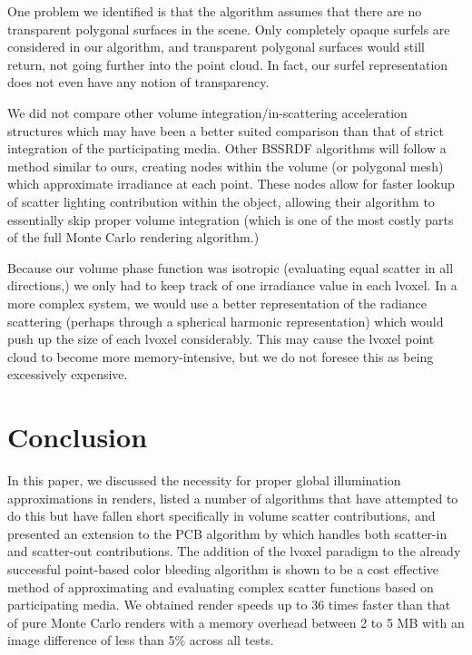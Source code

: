 \documentclass[12pt]{ucthesis}
\begin{document}
One problem we identified is that the algorithm assumes that there are no transparent polygonal surfaces in the scene.  Only completely opaque surfels are considered in our algorithm, and transparent polygonal surfaces would still return, not going further into the point cloud.  In fact, our surfel representation does not even have any notion of transparency.

\vspace{5mm}

We did not compare other volume integration/in-scattering acceleration structures which may have been a better suited comparison than that of strict integration of the participating media.  Other BSSRDF algorithms will follow a method similar to ours, creating nodes within the volume (or polygonal mesh) which approximate irradiance at each point.  These nodes allow for faster lookup of scatter lighting contribution within the object, allowing their algorithm to essentially skip proper volume integration (which is one of the most costly parts of the full Monte Carlo rendering algorithm.)

\vspace{5mm}

Because our volume phase function was isotropic (evaluating equal scatter in all directions,) we only had to keep track of one irradiance value in each lvoxel.  In a more complex system, we would use a better representation of the radiance scattering (perhaps through a spherical harmonic representation) which would push up the size of each lvoxel considerably.  This may cause the lvoxel point cloud to become more memory-intensive, but we do not foresee this as being excessively expensive.

\section{Conclusion}
In this paper, we discussed the necessity for proper global illumination approximations in renders, listed a number of algorithms that have attempted to do this but have fallen short specifically in volume scatter contributions, and presented an extension to the PCB algorithm by \cite{christensen:2008} which handles both scatter-in and scatter-out contributions.  The addition of the lvoxel paradigm to the already successful point-based color bleeding algorithm is shown to be a cost effective method of approximating and evaluating complex scatter functions based on participating media.  We obtained render speeds up to 36 times faster than that of pure Monte Carlo renders with a memory overhead between 2 to 5 MB with an image difference of less than 5\% across all tests.
\end{document}
